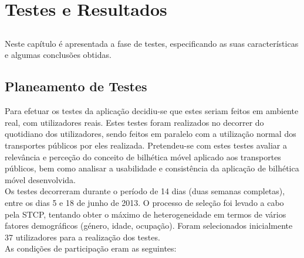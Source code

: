\chapter{Testes e Resultados} \label{chap:testes}

\section*{}

Neste capítulo é apresentada a fase de testes, especificando as suas características e algumas conclusões obtidas.

\section{Planeamento de Testes}

Para efetuar os testes da aplicação decidiu-se que estes seriam feitos em ambiente real, com utilizadores reais. Estes testes foram realizados no decorrer do quotidiano dos utilizadores, sendo feitos em paralelo com a utilização normal dos transportes públicos por eles realizada. Pretendeu-se com estes testes avaliar a relevância e perceção do conceito de bilhética móvel aplicado aos transportes públicos, bem como analisar a usabilidade e consistência da aplicação de bilhética móvel desenvolvida.
\\Os testes decorreram durante o período de 14 dias (duas semanas completas), entre os dias 5 e 18 de junho de 2013. O processo de seleção foi levado a cabo pela STCP, tentando obter o máximo de heterogeneidade em termos de vários fatores demográficos (género, idade, ocupação). Foram selecionados inicialmente 37 utilizadores para a realização dos testes.\cite{stcp}
\\As condições de participação eram as seguintes:

